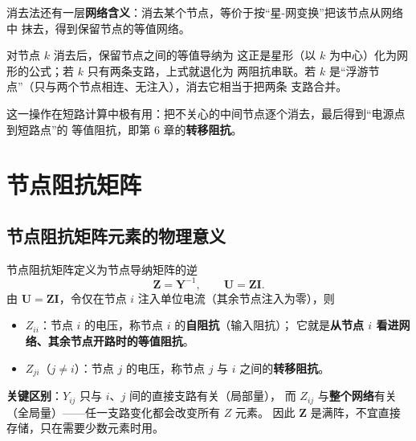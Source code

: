 消去法还有一层\textbf{网络含义}：消去某个节点，等价于按“星-网变换”把该节点从网络中
抹去，得到保留节点的等值网络。

对节点 $k$ 消去后，保留节点之间的等值导纳为
这正是星形（以 $k$ 为中心）化为网形的公式；若 $k$ 只有两条支路，上式就退化为
两阻抗串联。若 $k$ 是“浮游节点”（只与两个节点相连、无注入），消去它相当于把两条
支路合并。

这一操作在短路计算中极有用：把不关心的中间节点逐个消去，最后得到“电源点到短路点”的
等值阻抗，即第 6 章的\textbf{转移阻抗}。


\section{节点阻抗矩阵}

\subsection{节点阻抗矩阵元素的物理意义}

节点阻抗矩阵定义为节点导纳矩阵的逆
\begin{equation}
  \boldsymbol Z=\boldsymbol Y^{-1},\qquad \boldsymbol U=\boldsymbol Z\boldsymbol I .
\end{equation}
由 $\boldsymbol U=\boldsymbol Z\boldsymbol I$，令仅在节点 $i$ 注入单位电流（其余节点注入为零），则
\begin{itemize}
  \item $Z_{ii}$：节点 $i$ 的电压，称节点 $i$ 的\textbf{自阻抗}（输入阻抗）；
        它就是\textbf{从节点 $i$ 看进网络、其余节点开路时的等值阻抗}。
  \item $Z_{ji}$（$j\ne i$）：节点 $j$ 的电压，称节点 $j$ 与 $i$ 之间的\textbf{转移阻抗}。
\end{itemize}
\textbf{关键区别}：$Y_{ij}$ 只与 $i$、$j$ 间的直接支路有关（局部量），
而 $Z_{ij}$ 与\textbf{整个网络}有关（全局量）——任一支路变化都会改变所有 $Z$ 元素。
因此 $\boldsymbol Z$ 是满阵，不宜直接存储，只在需要少数元素时用。

